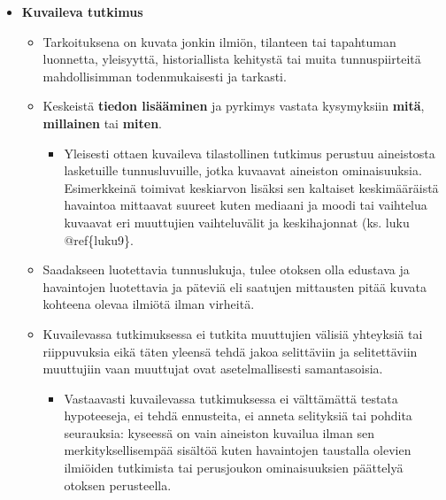 \documentclass[
]{book}
\providecommand{\tightlist}{%
  \setlength{\itemsep}{0pt}\setlength{\parskip}{0pt}}
\begin{document}
\begin{itemize}
\tightlist
\item
  \textbf{Kuvaileva tutkimus}

  \begin{itemize}
  \tightlist
  \item
    Tarkoituksena on kuvata jonkin ilmiön, tilanteen tai tapahtuman luonnetta, yleisyyttä, historiallista kehitystä tai muita tunnuspiirteitä mahdollisimman todenmukaisesti ja tarkasti.
  \item
    Keskeistä \textbf{tiedon lisääminen} ja pyrkimys vastata kysymyksiin \textbf{mitä}, \textbf{millainen} tai \textbf{miten}.

    \begin{itemize}
    \tightlist
    \item
      Yleisesti ottaen kuvaileva tilastollinen tutkimus perustuu aineistosta lasketuille tunnusluvuille, jotka kuvaavat aineiston ominaisuuksia. Esimerkkeinä toimivat keskiarvon lisäksi sen kaltaiset keskimääräistä havaintoa mittaavat suureet kuten mediaani ja moodi tai vaihtelua kuvaavat eri muuttujien vaihteluvälit ja keskihajonnat (ks. luku @ref\{luku9\}.
    \end{itemize}
  \item
    Saadakseen luotettavia tunnuslukuja, tulee otoksen olla edustava ja havaintojen luotettavia ja päteviä eli saatujen mittausten pitää kuvata kohteena olevaa ilmiötä ilman virheitä.
  \item
    Kuvailevassa tutkimuksessa ei tutkita muuttujien välisiä yhteyksiä tai riippuvuksia eikä täten yleensä tehdä jakoa selittäviin ja selitettäviin muuttujiin vaan muuttujat ovat asetelmallisesti samantasoisia.

    \begin{itemize}
    \tightlist
    \item
      Vastaavasti kuvailevassa tutkimuksessa ei välttämättä testata hypoteeseja, ei tehdä ennusteita, ei anneta selityksiä tai pohdita seurauksia: kyseessä on vain aineiston kuvailua ilman sen merkityksellisempää sisältöä kuten havaintojen taustalla olevien ilmiöiden tutkimista tai perusjoukon ominaisuuksien päättelyä otoksen perusteella.
    \end{itemize}
  \end{itemize}
\end{itemize}

\hfill\break
\end{document}
